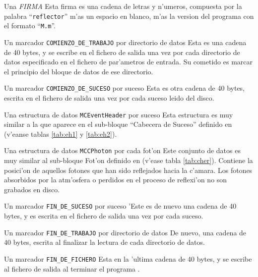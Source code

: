 \begin{Uentry}
  
\item[Una \emph{FIRMA}]
%
  Esta firma es una cadena de letras y n'umeros, compuesta por la
  palabra 
  ``\texttt{reflector}'' m'as un espacio en blanco, m'as la version
  del programa con el formato ``\texttt{M.m}''.

\item[Un marcador \texttt{COMIENZO\_DE\_TRABAJO} por directorio de datos]
%
  Esta es una cadena de 40 bytes, y se escribe en el fichero de salida
  una vez por cada directorio de datos especificado en el fichero de
  par'ametros de entrada.  Su cometido es marcar el principio del
  bloque de datos de ese directorio.

\item[Un marcador \texttt{COMIENZO\_DE\_SUCESO} por suceso]
%
  Esta es otra cadena de 40 bytes, escrita en el fichero de salida una
  vez por cada suceso leido del disco.

\item[Una estructura de datos \texttt{MCEventHeader} por suceso]
%
  Esta estructura es muy similar a la que aparece en el sub-bloque
  ``Cabecera de Suceso'' definido en \CORSIKA (v'eanse tablas
  \ref{tab:eh1} y \ref{tab:eh2}).

\item[Una estructura de datos \texttt{MCCPhoton} por cada fot'on]
%
  Este conjunto de datos es muy similar al sub-bloque Fot'on
  \Cherenkov definido en \CORSIKA (v'ease tabla \ref{tab:cher}).
  Contiene la posici'on de aquellos fotones que han sido reflejados
  hacia la c'amara.  Los fotones absorbidos por la atm'osfera o
  perdidos en el proceso de reflexi'on no son grabados en disco.
  
\item[Un marcador \texttt{FIN\_DE\_SUCESO} por suceso]
%
  'Este es de nuevo una cadena de 40 bytes, y es escrita en el fichero
  de salida una vez por cada suceso.

\item[Un marcador \texttt{FIN\_DE\_TRABAJO} por directorio de datos]
%
  De nuevo, una cadena de 40 bytes, escrita al finalizar la lectura de
  cada directorio de datos.

\item[Un marcador \texttt{FIN\_DE\_FICHERO}]
%
  Esta en la 'ultima cadena de 40 bytes, y se escribe al fichero de
  salida al terminar el programa .

\end{Uentry}

